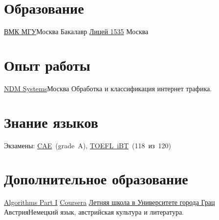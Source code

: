 \documentclass[11pt,a4paper,roman]{moderncv}
\begin{document}
\makecvtitle

\section{Образование}
        {\href{http://cs.msu.ru/}{ВМК МГУ}}{Москва}
        {Бакалавр}
        {}
        {\href{http://liceum1535.ru/}{Лицей 1535}}
        {Москва}
        {}{}
\section{Опыт работы}
        {\href{http://www.ndmsystems.com}{NDM Systems}}{Москва}
        {}{Обработка и классификация интернет трафика.}

\section{Знание языков}
  {Экзамены:
    \href{https://ru.wikipedia.org/wiki/Certificate_in_Advanced_English}{CAE}~(grade~A),
    \href{https://ru.wikipedia.org/wiki/TOEFL}{TOEFL~iBT}~(118~из~120)
  }

\section{Дополнительное образование}
        {\href{https://www.coursera.org/course/algs4partI}{Algorithms Part I}}
        {\href{https://www.coursera.org/course/algs4partI}{Coursera}}
        {}{}{}
        {\href{http://treffpunktsprachen.uni-graz.at/en/}{Летняя школа в Университете города Грац}}
        {Австрия}{}{Немецкий язык, австрийская культура и литература.}
\end{document}
